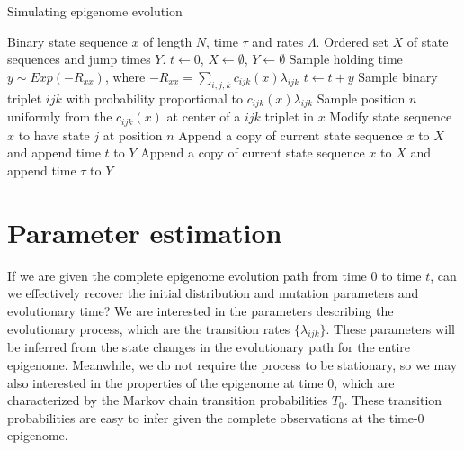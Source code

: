 \documentclass[11pt]{article}
\begin{document}
\begin{algorithm}[t]
  \begin{algorithmic}[1]
    \caption{Simulating epigenome evolution}
    \REQUIRE Binary state sequence $x$ of length $N$, time $\tau$ and rates $\Lambda$.
    \ENSURE Ordered set $X$ of state sequences and jump times $Y$.
    \STATE $t \gets 0$, $X\gets\emptyset$, $Y\gets\emptyset$
    \STATE Sample holding time $y\sim \mathit{Exp}(-R_{xx})$, where $-R_{xx} = \sum_{i,j,k}c_{ijk}(x)\lambda_{ijk}$
    \STATE $t \gets t + y$
    \STATE Sample binary triplet $ijk$ with probability proportional to $c_{ijk}(x)\lambda_{ijk}$
    \STATE Sample position $n$ uniformly from the $c_{ijk}(x)$ at center of a $ijk$ triplet in $x$
    \STATE Modify state sequence $x$ to have state $\bar{j}$ at position $n$
    \STATE Append a copy of current state sequence $x$ to $X$ and append time $t$ to $Y$
    \ENDIF
    \ENDWHILE
    \STATE Append a copy of current state sequence $x$ to $X$ and append time $\tau$ to $Y$
  \end{algorithmic}
\end{algorithm}



\section{Parameter estimation}

If we are given the complete epigenome evolution path from time $0$ to
time $t$, can we effectively recover the initial distribution and
mutation parameters and evolutionary time? We are interested in the
parameters describing the evolutionary process, which are the
transition rates $\{\lambda_{ijk}\}$. These parameters will be
inferred from the state changes in the evolutionary path for the
entire epigenome. Meanwhile, we do not require the process to be
stationary, so we may also interested in the properties of the
epigenome at time 0, which are characterized by the Markov chain
transition probabilities $T_{0}$. These transition probabilities are
easy to infer given the complete observations at the time-0 epigenome.
\end{document}
